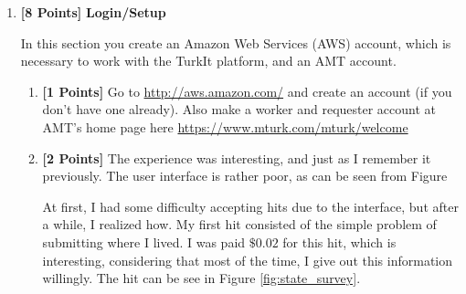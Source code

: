 \documentclass[11pt]{article}
\newcommand{\points}[1]{\textbf{[#1 Points]}}
\begin{document}
\begin{enumerate}
\begin{enumerate}
\item \points{4} 
The object of type algebra can be defined as follows:
\begin{lstlisting}
var Algebra = {
  operation : "multiplication",
  mul : function mult(x,y){return x*y},
  genprod : function prod(n,f){
    if(n==0) {
      return 1;
    }
    else {
      var r = prod(n-1,f);
      return r * f(n);
    }
  }
 };
\end{lstlisting}
From the above, we can see that we have a (i) a property \texttt{operation} equal to the string ``multiplication", (ii)  a property \texttt{mul} that is a function
to compute the product of its two arguments, and (iii) a property \texttt{genprod}. 

As for (iv), \texttt{Algebra.genprod(n, function(x) \{ return x \})} calculates the $n!$.

Note: Some might be curious as to why we didn't simply use \texttt{ this....} to reference the defined functions recursively. The explanation for the curiosity can be found \href{http://stackoverflow.com/questions/9006587/javascript-object-literal-method-recursive-call}{here}, where our method is explained as superior.

\end{enumerate}
%
\item \points{8} {\bf Login/Setup}

In this section you create an Amazon Web Services (AWS) account, which is necessary to work with the TurkIt platform, and an AMT account. 
%
\begin{enumerate}
\item \points{1} Go to \url{http://aws.amazon.com/} and create an account (if you don't have one already). Also make a worker and requester account at AMT's home page here \url{https://www.mturk.com/mturk/welcome}
%
\item \points{2} 
The experience was interesting, and just as I remember it previously. The user interface is rather poor, as can be seen from Figure %


At first, I had some difficulty accepting hits due to the interface, but after a while, I realized how. My first hit consisted of the simple problem of submitting where I lived. I was paid $\$0.02$ for this hit, which is interesting, considering that most of the time, I give out this information willingly. The hit can be see in Figure \ref{fig:state_survey}.


\end{enumerate}
\end{enumerate}
\end{document}

